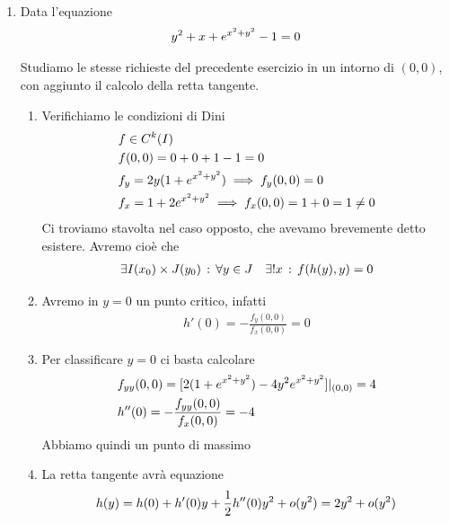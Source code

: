 \begin{enumerate}
	\item Data l'equazione
	\begin{align}
		y^2 + x+ e^{x^2 + y^2} -1 =0
	\end{align}
	
	Studiamo le stesse richieste del precedente esercizio in un intorno di $(0,0)$, con aggiunto il calcolo della retta tangente.
	
	\begin{enumerate}
		\item Verifichiamo le condizioni di Dini
		\begin{align}
			{}&f\in C^k(I)\\
			& f(0,0)=0+0+ 1-1=0\\
			& f_y= 2y(1+e^{x^2 + y^2})\implies f_y(0,0)= 0 \\
			& f_x= 1 + 2e^{x^2 + y^2} \implies f_x(0,0)= 1+0=1\neq 0
		\end{align}
		Ci troviamo stavolta nel caso opposto, che avevamo brevemente detto esistere. Avremo cioè che
		\begin{align}
			\exists I(x_0)\times J(y_0) \, : \, \forall y \in J \quad \exists ! x \, : \, f(h(y),y)=0
		\end{align} 
		
		\item Avremo in $y=0$ un punto critico, infatti
		\begin{align}
			h'(0)= -\frac{f_y(0,0)}{f_x(0,0)} =0
		\end{align}
		
		\item Per classificare $y=0$ ci basta calcolare
		\begin{align}
			{}&f_{yy}(0,0)= [2(1+e^{x^2 + y^2}) - 4y^2e^{x^2 + y^2}]|_{(0,0)}= 4\\&h''(0)=-\frac{f_{yy}(0,0)}{f_x(0,0)}=-4
		\end{align}
		Abbiamo quindi un punto di massimo
		
		\item La retta tangente avrà equazione
		\begin{align}
			h(y)= h(0) + h'(0)y + \frac{1}{2} h''(0)y^2 + o(y^2)= 2y^2 + o(y^2)
		\end{align}
	\end{enumerate}
\end{enumerate}

\newpage

